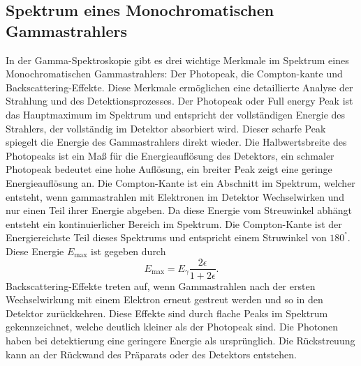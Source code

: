 \subsection{Spektrum eines Monochromatischen Gammastrahlers}
In der Gamma-Spektroskopie gibt es drei wichtige Merkmale im Spektrum eines Monochromatischen Gammastrahlers: Der Photopeak,
die Compton-kante und Backscattering-Effekte. Diese Merkmale ermöglichen eine detaillierte Analyse der Strahlung und des Detektionsprozesses.
Der Photopeak oder Full energy Peak ist das Hauptmaximum im Spektrum und entspricht der vollständigen Energie
des Strahlers, der vollständig im Detektor absorbiert wird. Dieser scharfe Peak spiegelt die Energie des Gammastrahlers direkt wieder.
Die Halbwertsbreite des Photopeaks ist ein Maß für die Energieauflösung des Detektors, ein schmaler Photopeak bedeutet eine
hohe Auflösung, ein breiter Peak zeigt eine geringe Energieauflösung an.
Die Compton-Kante ist ein Abschnitt im Spektrum, welcher entsteht, wenn gammastrahlen mit Elektronen im Detektor Wechselwirken und nur
einen Teil ihrer Energie abgeben. Da diese Energie vom Streuwinkel abhängt entsteht ein kontinuierlicher Bereich im 
Spektrum. Die Compton-Kante ist der Energiereichste Teil dieses Spektrums und entspricht einem Struwinkel von $180^°$.
Diese Energie $E_{\text{max}}$ ist gegeben durch
\begin{equation}
    E_{\text{max}}=E_{\gamma}\frac{2\epsilon}{1+2\epsilon}.
    \label{eq:E_max}
\end{equation}    
Backscattering-Effekte treten auf, wenn Gammastrahlen nach der ersten Wechselwirkung mit einem Elektron erneut gestreut werden 
und so in den Detektor zurückkehren. Diese Effekte sind durch flache Peaks im Spektrum gekennzeichnet, welche deutlich kleiner als
der Photopeak sind. Die Photonen haben bei detektierung eine geringere Energie als ursprünglich. Die Rückstreuung kann an der Rückwand
des Präparats oder des Detektors entstehen.

